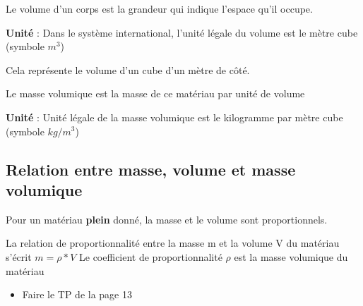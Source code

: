 \documentclass[a4paper,12pt]{article}
\begin{document}
\begin{tcolorbox}
    Le volume d'un corps est la grandeur qui indique l'espace qu'il occupe. \par
    \textbf{Unité} : Dans le système international, l'unité légale du volume est le mètre cube (symbole \textbf{$m^3$})
\end{tcolorbox}
  
Cela représente le volume d'un cube d'un mètre de côté.
  
  \begin{tcolorbox}
    Le masse volumique est la masse de ce matériau par unité de volume \par
    \textbf{Unité} : Unité légale de la masse volumique est le kilogramme par mètre cube (symbole \textbf{$kg / m^3$})
  \end{tcolorbox}
  
\subsection{Relation entre masse, volume et masse volumique}
  
Pour un matériau \textbf{plein} donné, la masse et le volume sont proportionnels. 
  
\begin{tcolorbox}
  La relation de proportionnalité entre la masse m et la volume V du matériau s'écrit
  \(m = \rho * V\)
  Le coefficient de proportionnalité \(\rho\) est la masse volumique du matériau
\end{tcolorbox}


\begin{tcolorbox}[colback=blue!10!white, colframe=blue!75!black, title=Exemples - Application]
  \begin{itemize}[noitemsep]
    \item Faire le TP de la page 13
  \end{itemize}
\end{tcolorbox}
\end{document}
